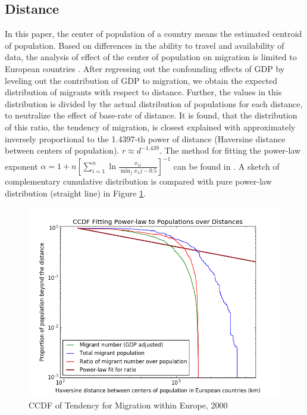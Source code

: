 \documentclass{acm_proc_article-sp}
\begin{document}
\subsection{Distance}
In this paper, the center of population of a country means the estimated centroid of population. Based on differences in the ability to travel and availability of data, the analysis of effect of the center of population on migration is limited to European countries \cite{hamerly}. After regressing out the confounding effects of GDP by leveling out the contribution of GDP to migration, we obtain the expected distribution of migrants with respect to distance. Further, the values in this distribution is divided by the actual distribution of populations for each distance, to neutralize the effect of base-rate of distance. It is found, that the distribution of this ratio, the tendency of migration, is closest explained with approximately inversely proportional to the 1.4397-th power of distance (Haversine distance between centers of population). $r \approx d^{-1.439}$. The method for fitting the power-law exponent 
$\alpha = 1 + n [\sum_{i=1}^n \ln \frac{x_{1i}}{\min_j{x_1j} - 0.5} ]^{-1}$ 
can be found in \cite{clauset, newman05}. A sketch of complementary cumulative distribution is compared with pure power-law distribution (straight line) in Figure \ref{fig:ccdf}. 

\begin{figure}[H]
    \includegraphics[width=\columnwidth, keepaspectratio=true]{ccdf_distance.png}
    \caption{CCDF of Tendency for Migration within Europe, 2000}
    \label{fig:ccdf}
\end{figure}
\end{document}

